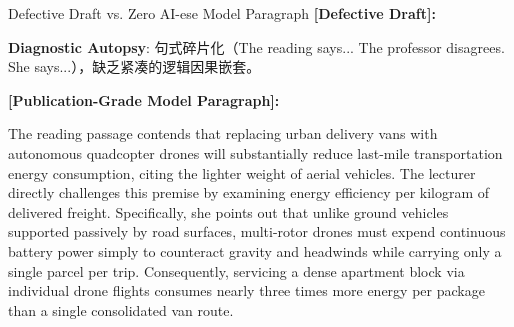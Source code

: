 \begin{ExampleBox}{Defective Draft vs. Zero AI-ese Model Paragraph}
\textbf{\color{TargetHighlight}[Defective Draft]:}\par
{}\par\vspace{4pt}
\textbf{Diagnostic Autopsy}: 句式碎片化（The reading says... The professor disagrees. She says...），缺乏紧凑的逻辑因果嵌套。\par\vspace{6pt}
\textbf{\color{AcadNavy}[Publication-Grade Model Paragraph]:}\par
The reading passage contends that replacing urban delivery vans with autonomous quadcopter drones will substantially reduce last-mile transportation energy consumption, citing the lighter weight of aerial vehicles. The lecturer directly challenges this premise by examining energy efficiency per kilogram of delivered freight. Specifically, she points out that unlike ground vehicles supported passively by road surfaces, multi-rotor drones must expend continuous battery power simply to counteract gravity and headwinds while carrying only a single parcel per trip. Consequently, servicing a dense apartment block via individual drone flights consumes nearly three times more energy per package than a single consolidated van route.
\end{ExampleBox}
